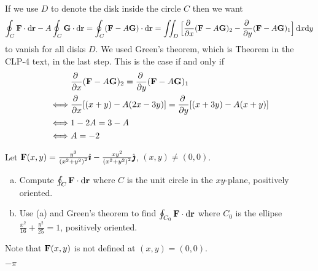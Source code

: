 \begin{solution} 
If we use $D$ to denote the disk inside the circle $C$
then we want
$$
\oint_C\vF\cdot \dee{\vr}-A\oint_C\vG\cdot \dee{\vr}
=\oint_C(\vF-A\vG)\cdot \dee{\vr}
=\dblInt_D \Big[\pdiff{}{x}(\vF-A\vG)_2
-\pdiff{}{y}(\vF-A\vG)_1\Big]\,\dee{x}\dee{y}
$$
to vanish for all disks $D$. We used Green's theorem, which is Theorem
 in the CLP-4 text,  in the last step. 
This is the case if and only if
\begin{align*}
&\pdiff{}{x}(\vF-A\vG)_2
=\pdiff{}{y}(\vF-A\vG)_1\\
\iff&
\pdiff{}{x}[(x+y)-A(2x-3y)]
=\pdiff{}{y}[(x+3y)-A(x+y)]\\
\iff&
1-2A=3-A\\
\iff& A=-2
\end{align*}
\end{solution}

\begin{question}[M317 2001D] %
Let
$\mathbf{F}(x,y) = \frac{y^3}{ {(x^2+y^2)}^2}\hat{\pmb{\imath}}
              -\frac{xy^2}{ {(x^2+y^2)}^2}\hat{\pmb{\jmath}}$, $(x,y)\ne (0,0)$.
\smallskip
\begin{enumerate}[(a)]
\item 
Compute $\oint_C\mathbf{F}\cdot \mathrm{d}\mathbf{r}$ where $C$ is the unit circle
in the $xy$-plane, positively oriented.

\item
Use (a) and Green's theorem to find $\oint_{C_0}\mathbf{F}\cdot \mathrm{d}\mathbf{r}$
where $C_0$ is the ellipse $\frac{x^2}{16}+\frac{y^2}{25}=1$, positively
oriented.

\end{enumerate}
\end{question}

\begin{hint} 
Note that $\mathbf{F}(x,y)$ is not defined at $(x,y)=(0,0)$.
\end{hint}

\begin{answer} 
$-\pi$
\end{answer}

